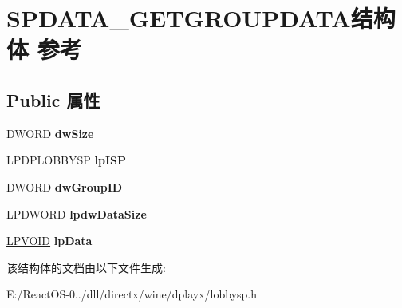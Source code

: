 \hypertarget{struct_s_p_d_a_t_a___g_e_t_g_r_o_u_p_d_a_t_a}{}\section{S\+P\+D\+A\+T\+A\+\_\+\+G\+E\+T\+G\+R\+O\+U\+P\+D\+A\+T\+A结构体 参考}
\label{struct_s_p_d_a_t_a___g_e_t_g_r_o_u_p_d_a_t_a}
\subsection*{Public 属性}
\begin{DoxyCompactItemize}
\item 
\mbox{\label{struct_s_p_d_a_t_a___g_e_t_g_r_o_u_p_d_a_t_a_a098f76894118f892c7c8e9bb82cab995}} 
D\+W\+O\+RD {\bfseries dw\+Size}
\item 
\mbox{\label{struct_s_p_d_a_t_a___g_e_t_g_r_o_u_p_d_a_t_a_abbc50360e30a59d85e0733ab2bb50e85}} 
L\+P\+D\+P\+L\+O\+B\+B\+Y\+SP {\bfseries lp\+I\+SP}
\item 
\mbox{\label{struct_s_p_d_a_t_a___g_e_t_g_r_o_u_p_d_a_t_a_a820f3101824d2aba67e948688b3257c5}} 
D\+W\+O\+RD {\bfseries dw\+Group\+ID}
\item 
\mbox{\label{struct_s_p_d_a_t_a___g_e_t_g_r_o_u_p_d_a_t_a_a4c5fb6ced38bc07a8133cfbd7f973142}} 
L\+P\+D\+W\+O\+RD {\bfseries lpdw\+Data\+Size}
\item 
\mbox{\label{struct_s_p_d_a_t_a___g_e_t_g_r_o_u_p_d_a_t_a_a2c3ace1018a94923423d8f118590ce0d}} 
\hyperlink{interfacevoid}{L\+P\+V\+O\+ID} {\bfseries lp\+Data}
\end{DoxyCompactItemize}


该结构体的文档由以下文件生成\+:\begin{DoxyCompactItemize}
\item 
E\+:/\+React\+O\+S-\/0../dll/directx/wine/dplayx/lobbysp.\+h\end{DoxyCompactItemize}
